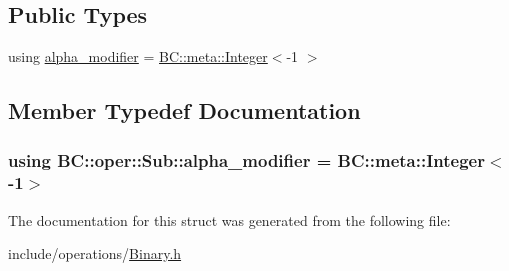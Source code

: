 \subsection*{Public Types}
\begin{DoxyCompactItemize}
\item 
using \hyperlink{structBC_1_1oper_1_1Sub_aeb848ace8f36f954847756b3321576a0}{alpha\+\_\+modifier} = \hyperlink{structBC_1_1meta_1_1Integer}{B\+C\+::meta\+::\+Integer}$<$-\/1 $>$
\end{DoxyCompactItemize}


\subsection{Member Typedef Documentation}
\subsubsection[{\texorpdfstring{alpha\+\_\+modifier}{alpha_modifier}}]{\setlength{\rightskip}{0pt plus 5cm}using {\bf B\+C\+::oper\+::\+Sub\+::alpha\+\_\+modifier} =  {\bf B\+C\+::meta\+::\+Integer}$<$-\/1$>$}\hypertarget{structBC_1_1oper_1_1Sub_aeb848ace8f36f954847756b3321576a0}{}\label{structBC_1_1oper_1_1Sub_aeb848ace8f36f954847756b3321576a0}


The documentation for this struct was generated from the following file\+:\begin{DoxyCompactItemize}
\item 
include/operations/\hyperlink{Binary_8h}{Binary.\+h}\end{DoxyCompactItemize}
